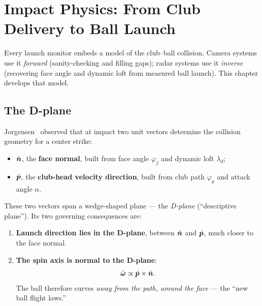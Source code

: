\chapter{Impact Physics: From Club Delivery to Ball Launch}
\label{ch:impact}

Every launch monitor embeds a model of the club--ball collision. Camera
systems use it \emph{forward} (sanity-checking and filling gaps); radar
systems use it \emph{inverse} (recovering face angle and dynamic loft from
measured ball launch). This chapter develops that model.

\section{The D-plane}
\label{sec:dplane}

Jorgensen~\cite{jorgensen} observed that at impact two unit vectors
determine the collision geometry for a center strike:
\begin{itemize}
  \item $\hat{\bm{n}}$, the \textbf{face normal}, built from face angle
        $\varphi_f$ and dynamic loft $\lambda_d$;
  \item $\hat{\bm{p}}$, the \textbf{club-head velocity direction}, built from
        club path $\varphi_p$ and attack angle $\alpha$.
\end{itemize}
These two vectors span a wedge-shaped plane --- the \emph{D-plane}
(``descriptive plane''). Its two governing consequences are:

\begin{enumerate}
\item \textbf{Launch direction lies in the D-plane}, between $\hat{\bm{n}}$ and
$\hat{\bm{p}}$, much closer to the face normal.
\item \textbf{The spin axis is normal to the D-plane}:
\begin{equation}
\label{eq:spinaxisdplane}
\hat{\bm{\omega}} \propto \hat{\bm{p}} \times \hat{\bm{n}}.
\end{equation}
The ball therefore curves \emph{away from the path, around the face} ---
the ``new ball flight laws.''
\end{enumerate}

